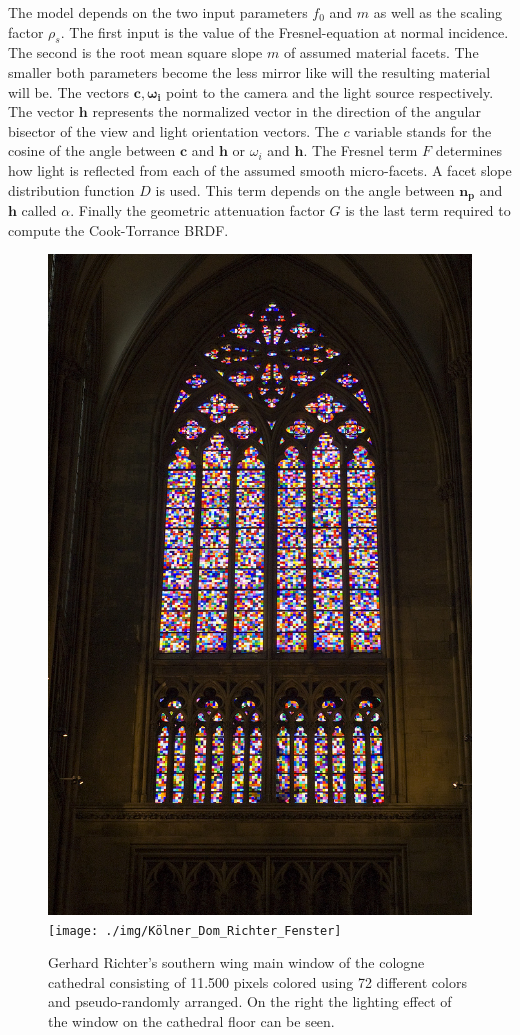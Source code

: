 The model depends on the two input parameters $f_0$ and $m$ as well as the scaling factor $\rho_s$. The first input is the value of the Fresnel-equation at normal incidence. The second is the root mean square slope $m$ of assumed material facets. The smaller both parameters become the less mirror like will the resulting material will be. The vectors $\mathbf{c,\omega_i}$ point to the camera and the light source respectively.
The vector $\mathbf{h}$ represents the normalized vector in the direction of the angular bisector of the view and light orientation vectors.
The $c$ variable stands for the cosine of the angle between $\mathbf{c}$ and $\mathbf{h}$ or $\omega_i$ and $\mathbf{h}$. 
The Fresnel term $F$ determines how light is reflected from each of the assumed smooth micro-facets. 
A facet slope distribution function $D$ is used. This term depends on the angle between $\mathbf{n_p}$ and $\mathbf{h}$ called $\alpha$.
Finally the geometric attenuation factor $G$ is the last term required to compute the Cook-Torrance BRDF.
\begin{figure}
\centering
\includegraphics[width=0.25\linewidth]{./img/Richter_window_Cologne_Cathedral}
\texttt{[image: ./img/Kölner\_Dom\_Richter\_Fenster]}
\caption{Gerhard Richter's southern wing main window of the cologne cathedral consisting of 11.500 pixels colored using 72 different colors and pseudo-randomly arranged. On the right the lighting effect of the window on the cathedral floor can be seen.}
\label{fig:Richter_window_Cologne_Cathedral}
\end{figure}
